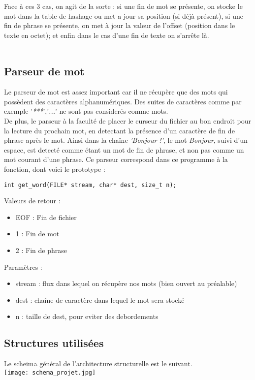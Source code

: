 \documentclass[french, 12pt, titlepage]{article}
\begin{document}
Face à ces 3 cas, on agit de la sorte : si une fin de mot se présente,
on stocke le mot dans la table de hashage ou met a jour sa position
(si déjà présent), si une fin de phrase se présente, on met à jour la
valeur de l'offset (position dans le texte en octet); et enfin dans le
cas d'une fin de texte on s'arrête là.\\\\

\subsection{Parseur de mot}
Le parseur de mot est assez important car il ne récupère que des mots
qui possèdent des caractères alphanumériques. Des suites de caractères
comme par exemple '\textit{***}','\textit{...}' ne sont pas considerés
comme mots.\\
De plus, le parseur à la faculté de placer le curseur du fichier au
bon endroit pour la lecture du prochain mot, en detectant la présence
d'un caractère de fin de phrase après le mot. Ainsi dans la chaîne
\textit{'Bonjour  !'}, le mot \textit{Bonjour}, suivi d'un espace, est
detecté comme étant un mot de fin de phrase, et non pas comme un mot
courant d'une phrase.
\newpage
Ce parseur correspond dans ce programme à la fonction, dont voici le
prototype :

\begin{lstlisting}
int get_word(FILE* stream, char* dest, size_t n);
\end{lstlisting}
Valeurs de retour :
\begin{itemize}
\item EOF   : Fin de fichier
\item 1     : Fin de mot
\item 2     : Fin de phrase
\end{itemize}

Paramètres :
\begin{itemize}
\item stream    : flux dans lequel on récupère nos mots (bien ouvert
  au préalable)
\item dest      : chaîne de caractère dans lequel le mot sera stocké
\item n         : taille de dest, pour eviter des debordements
\end{itemize}

\subsection{Structures utilisées}
Le scheima général de l'architecture structurelle est le suivant.
\\
\texttt{[image: schema\_projet.jpg]}
\\
\end{document}
